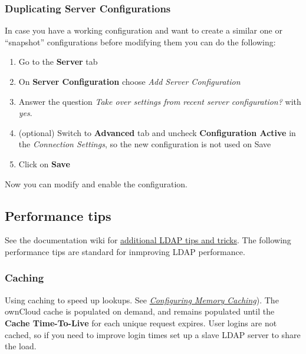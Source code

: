 \documentclass[letterpaper,10pt,english]{sphinxmanual}
\begin{document}
\subsubsection{Duplicating Server Configurations}
\label{configuration_user/user_auth_ldap:duplicating-server-configurations}
In case you have a working configuration and want to create a similar one or
``snapshot'' configurations before modifying them you can do the following:
\begin{enumerate}
\item {} 
Go to the \textbf{Server} tab

\item {} 
On \textbf{Server Configuration} choose \emph{Add Server Configuration}

\item {} 
Answer the question \emph{Take over settings from recent server configuration?}
with \emph{yes}.

\item {} 
(optional) Switch to \textbf{Advanced} tab and uncheck \textbf{Configuration Active}
in the \emph{Connection Settings}, so the new configuration is not used on Save

\item {} 
Click on \textbf{Save}

\end{enumerate}

Now you can modify and enable the configuration.


\subsection{Performance tips}
\label{configuration_user/user_auth_ldap:performance-tips}
See the documentation wiki for \href{https://github.com/owncloud/documentation/wiki/LDAP-Tips-for-Active-Directory-and-openLDAP}{additional LDAP tips and tricks}. The following performance tips are standard for inmproving LDAP performance.


\subsubsection{Caching}
\label{configuration_user/user_auth_ldap:caching}
Using caching to speed up lookups. See {\hyperref[configuration_server/caching_configuration::doc]{\emph{Configuring Memory Caching}}}). The ownCloud cache is populated on demand, and remains populated until the \textbf{Cache Time-To-Live} for each unique request expires. User logins are not cached, so if you need to improve login times set up a slave LDAP server to share the load.
\end{document}
